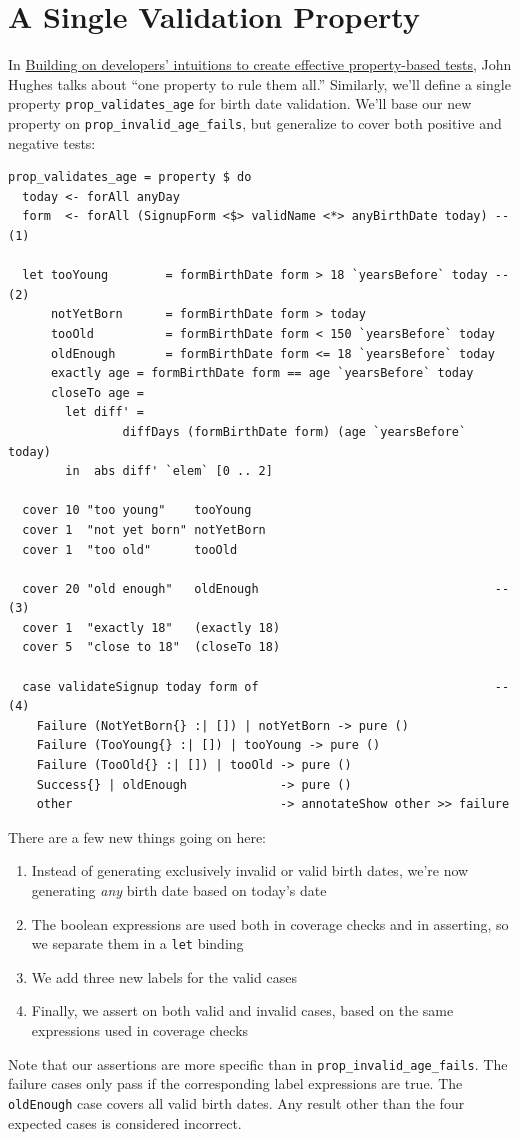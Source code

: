 \section{A Single Validation
Property}
\label{a-single-validation-property}

In \href{https://www.youtube.com/watch?v=NcJOiQlzlXQ}{Building on
developers' intuitions to create effective property-based tests}, John
Hughes talks about ``one property to rule them all.'' Similarly, we'll
define a single property \texttt{prop\_validates\_age} for birth date
validation. We'll base our new property on
\texttt{prop\_invalid\_age\_fails}, but generalize to cover both
positive and negative tests:

\begin{verbatim}
prop_validates_age = property $ do
  today <- forAll anyDay
  form  <- forAll (SignupForm <$> validName <*> anyBirthDate today) -- (1)

  let tooYoung        = formBirthDate form > 18 `yearsBefore` today -- (2)
      notYetBorn      = formBirthDate form > today
      tooOld          = formBirthDate form < 150 `yearsBefore` today
      oldEnough       = formBirthDate form <= 18 `yearsBefore` today
      exactly age = formBirthDate form == age `yearsBefore` today
      closeTo age =
        let diff' =
                diffDays (formBirthDate form) (age `yearsBefore` today)
        in  abs diff' `elem` [0 .. 2]

  cover 10 "too young"    tooYoung
  cover 1  "not yet born" notYetBorn
  cover 1  "too old"      tooOld

  cover 20 "old enough"   oldEnough                                 -- (3)
  cover 1  "exactly 18"   (exactly 18)
  cover 5  "close to 18"  (closeTo 18)

  case validateSignup today form of                                 -- (4)
    Failure (NotYetBorn{} :| []) | notYetBorn -> pure ()
    Failure (TooYoung{} :| []) | tooYoung -> pure ()
    Failure (TooOld{} :| []) | tooOld -> pure ()
    Success{} | oldEnough             -> pure ()
    other                             -> annotateShow other >> failure
\end{verbatim}
There are a few new things going on here:

\begin{enumerate}
\item
  Instead of generating exclusively invalid or valid birth dates, we're
  now generating \emph{any} birth date based on today's date
\item
  The boolean expressions are used both in coverage checks and in
  asserting, so we separate them in a \texttt{let} binding
\item
  We add three new labels for the valid cases
\item
  Finally, we assert on both valid and invalid cases, based on the same
  expressions used in coverage checks
\end{enumerate}
Note that our assertions are more specific than in
\texttt{prop\_invalid\_age\_fails}. The failure cases only pass if the
corresponding label expressions are true. The \texttt{oldEnough} case
covers all valid birth dates. Any result other than the four expected
cases is considered incorrect.

